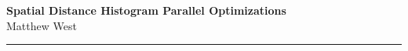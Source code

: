\documentclass[a4paper,12pt]{article}
\renewenvironment{abstract}
{\par\noindent\textbf{\abstractname}\ \ignorespaces \\}
{\par\noindent\medskip}
\begin{document}
	\pagestyle{fancy}
	\thispagestyle{empty}
	\fancyhead[R]{}
	\fancyhead[L]{}
	\renewcommand*{\thefootnote}{\fnsymbol{footnote}}
	\begin{center}
		\Large{\textbf{Spatial Distance Histogram Parallel Optimizations}}
		\vspace{0.4cm}
		\normalsize
		\\ Matthew West
		\vspace{0.1cm}
		\medskip
		\normalsize
	\end{center}
	{\color{gray}\hrule}
	\vspace{0.4cm}
	\medskip
\end{document}
